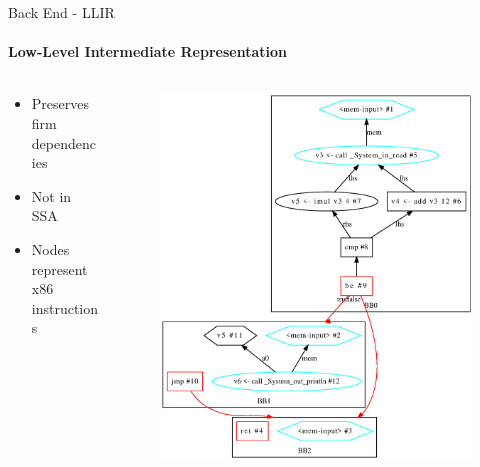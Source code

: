 \documentclass[en,16:9]{sdqbeamer}
\begin{document}
\begin{frame}{Back End - LLIR}
	\framesubtitle{Low-Level Intermediate Representation}
	
	\begin{columns}
		\begin{column}{0.35\textwidth}
			\begin{itemize}
				\item Preserves firm dependencies
				\item Not in SSA
				\item Nodes represent x86 instructions
			\end{itemize}
		\end{column}

		\begin{column}{0.65\textwidth}
			\vspace{-3em}
			\begin{figure}
				\centering
				\includegraphics[scale=0.26]{images/llir-example}
			\end{figure}
		\end{column}
	\end{columns}
\end{frame}
\end{document}
